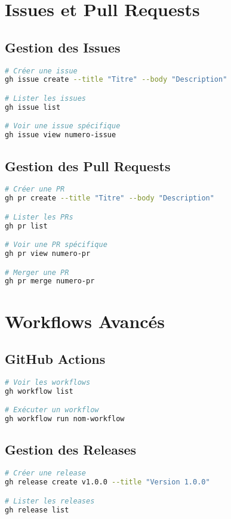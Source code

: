 \documentclass[11pt,a4paper]{article}
\begin{document}
\section{Issues et Pull Requests}
\subsection{Gestion des Issues}
\begin{lstlisting}[language=bash]
# Créer une issue
gh issue create --title "Titre" --body "Description"

# Lister les issues
gh issue list

# Voir une issue spécifique
gh issue view numero-issue
\end{lstlisting}

\subsection{Gestion des Pull Requests}
\begin{lstlisting}[language=bash]
# Créer une PR
gh pr create --title "Titre" --body "Description"

# Lister les PRs
gh pr list

# Voir une PR spécifique
gh pr view numero-pr

# Merger une PR
gh pr merge numero-pr
\end{lstlisting}

\section{Workflows Avancés}
\subsection{GitHub Actions}
\begin{lstlisting}[language=bash]
# Voir les workflows
gh workflow list

# Exécuter un workflow
gh workflow run nom-workflow
\end{lstlisting}

\subsection{Gestion des Releases}
\begin{lstlisting}[language=bash]
# Créer une release
gh release create v1.0.0 --title "Version 1.0.0"

# Lister les releases
gh release list
\end{lstlisting}
\end{document}
